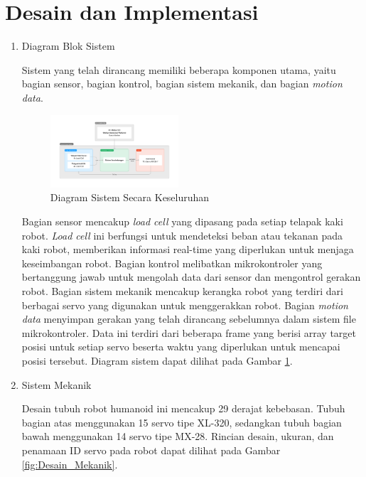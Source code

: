 \section{Desain dan Implementasi}
\label{sec:desaindanimplementasi}

\begin{enumerate}[label=\Alph*.]
    \item Diagram Blok Sistem
    \label{subsec:diagrambloksistem}

    \hspace*{1em} Sistem yang telah dirancang memiliki beberapa komponen utama, yaitu bagian sensor, bagian kontrol, bagian sistem mekanik, dan bagian \textit{motion data}. 

    \begin{figure} [h] \centering
        \includegraphics[width=0.45\textwidth]{gambar/Diagram_Sistem.png}
        \caption{Diagram Sistem Secara Keseluruhan}
        \label{fig:Diagram_Sistem}
    \end{figure}
    
    \hspace*{1em} Bagian sensor mencakup \emph{load cell} yang dipasang pada setiap telapak kaki robot. \emph{Load cell} ini berfungsi untuk mendeteksi beban atau tekanan pada kaki robot, memberikan informasi real-time yang diperlukan untuk menjaga keseimbangan robot. Bagian kontrol melibatkan mikrokontroler yang bertanggung jawab untuk mengolah data dari sensor dan mengontrol gerakan robot. Bagian sistem mekanik mencakup kerangka robot yang terdiri dari berbagai servo yang digunakan untuk menggerakkan robot. Bagian \textit{motion data} menyimpan gerakan yang telah dirancang sebelumnya dalam sistem file mikrokontroler. Data ini terdiri dari beberapa frame yang berisi array target posisi untuk setiap servo beserta waktu yang diperlukan untuk mencapai posisi tersebut. Diagram sistem dapat dilihat pada Gambar \ref{fig:Diagram_Sistem}.
    
    \item Sistem Mekanik
    \label{subsec:sistemmekanik}

    \hspace*{1em} Desain tubuh robot humanoid ini mencakup 29 derajat kebebasan. Tubuh bagian atas menggunakan 15 servo tipe XL-320, sedangkan tubuh bagian bawah menggunakan 14 servo tipe MX-28. Rincian desain, ukuran, dan penamaan ID servo pada robot dapat dilihat pada Gambar \ref{fig:Desain_Mekanik}. 


\end{enumerate}
